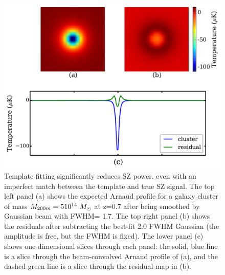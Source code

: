 {\begin{figure}
\includegraphics[width=\linewidth]{figs/template_fitting.pdf}
 \caption{Template fitting significantly reduces SZ power, even with an imperfect match between the template and true SZ signal. 
The top left panel (a) shows the expected Arnaud profile for a galaxy cluster of mass $M_{200m} = 5 10^{14}~ {M}_{\odot}$ at z=0.7 after being smoothed by Gaussian beam with FWHM= 1\arcmin.7.
The top right panel (b) shows the residuals after subtracting the best-fit 2\arcmin.0 FWHM Gaussian (the amplitude is free, but the FWHM is fixed). 
The lower panel (c) shows one-dimensional slices through each panel: the solid, blue line is a slice through the beam-convolved Arnaud profile of (a), and the dashed green line is a slice through the residual map in (b). 
 } 
\label{fig:residual}
\end{figure}
}\fi
